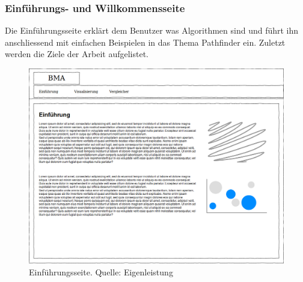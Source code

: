 \documentclass[12pt,a4paper,german]{report}
\begin{document}
\subsubsection{Einführungs- und Willkommensseite}
Die Einführungsseite erklärt dem Benutzer was Algorithmen sind und führt ihn anschliessend mit einfachen Beispielen in das Thema Pathfinder ein. Zuletzt werden die Ziele der Arbeit aufgelistet.
\begin{figure}[h]
  \centering
  \includegraphics[width=16cm]{einfuehrung1}
  \caption[Konzept der Einführungsseite.]{Einführungsseite. Quelle: Eigenleistung}
  \label{fig:einfuehrung1}
\end{figure}

\clearpage
\end{document}
